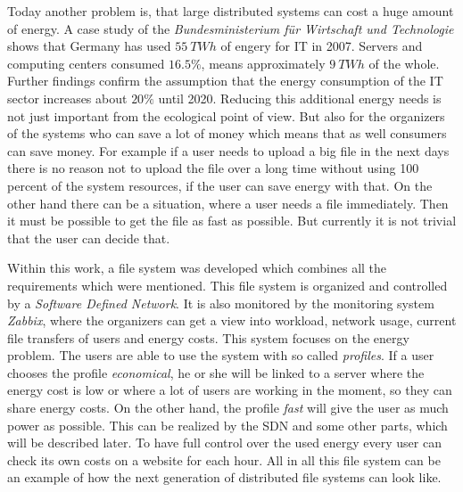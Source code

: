 Today another problem is, that large distributed systems can cost a huge amount of energy. A case study of the \textit{Bundesministerium f\"ur Wirtschaft und Technologie} shows that Germany has used $55\ TWh$ of engery for IT in 2007\cite{bmwi}. Servers and computing centers consumed $16.5 \%$, means approximately $9\ TWh$ of the whole. Further findings confirm the assumption that the energy consumption of the IT sector increases about $20 \%$ until 2020. Reducing this additional energy needs is not just important from the ecological point of view. But also for the organizers of the systems who can save a lot of money which means that as well consumers can save money. For example if a user needs to upload a big file in the next days there is no reason not to upload the file over a long time without using 100 percent of the system resources, if the user can save energy with that. On the other hand there can be a situation, where a user needs a file immediately. Then it must be possible to get the file as fast as possible. But currently it is not trivial that the user can decide that.  

Within this work, a file system was developed which combines all the requirements which were mentioned. This file system is organized and controlled by a \textit{Software Defined Network}. It is also monitored by the monitoring system \textit{Zabbix}, where the organizers can get a view into workload, network usage, current file transfers of users and energy costs. This system focuses on the energy problem. The users are able to use the system with so called \textit{profiles}. If a user chooses the profile \textit{economical}, he or she will be linked to a server where the energy cost is low or where a lot of users are working in the moment, so they can share energy costs. On the other hand, the profile \textit{fast} will give the user as much power as possible. This can be realized by the SDN and some other parts, which will be described later. To have full control over the used energy every user can check its own costs on a website for each hour. All in all this file system can be an example of how the next generation of distributed file systems can look like.             